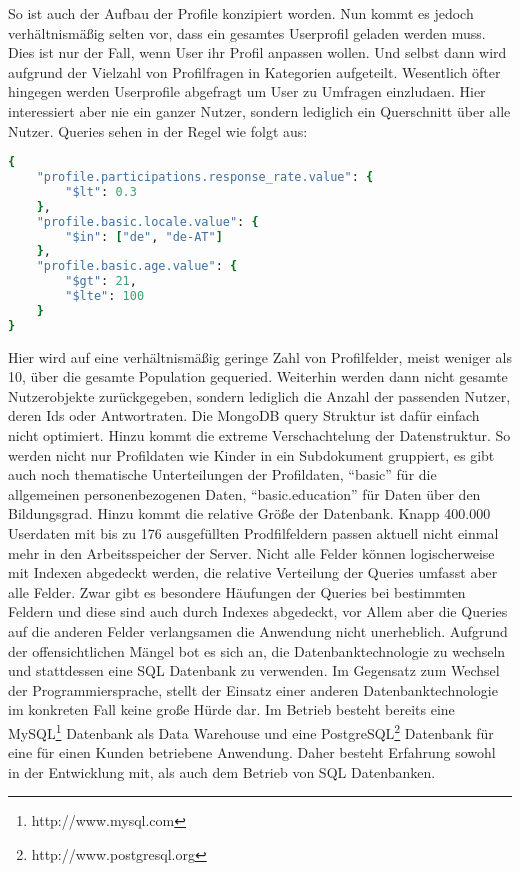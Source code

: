 So ist auch der Aufbau der Profile konzipiert worden. Nun kommt es jedoch verhältnismäßig selten vor, dass ein gesamtes Userprofil geladen werden muss. Dies ist nur der Fall, wenn User ihr Profil anpassen wollen. Und selbst dann wird aufgrund der Vielzahl von Profilfragen in Kategorien aufgeteilt.
Wesentlich öfter hingegen werden Userprofile abgefragt um User zu Umfragen einzludaen. Hier interessiert aber nie ein ganzer Nutzer, sondern lediglich ein Querschnitt über alle Nutzer. Queries sehen in der Regel wie folgt aus:
\begin{lstlisting}[language=Ruby]
{
    "profile.participations.response_rate.value": {
        "$lt": 0.3
    },
    "profile.basic.locale.value": {
        "$in": ["de", "de-AT"]
    },
    "profile.basic.age.value": {
        "$gt": 21,
        "$lte": 100
    }
}
\end{lstlisting}

Hier wird auf eine verhältnismäßig geringe Zahl von Profilfelder, meist weniger als 10, über die gesamte Population gequeried. Weiterhin werden dann nicht gesamte Nutzerobjekte zurückgegeben, sondern lediglich die Anzahl der passenden Nutzer, deren Ids oder Antwortraten. Die MongoDB query Struktur ist dafür einfach nicht optimiert. Hinzu kommt die extreme Verschachtelung der Datenstruktur. So werden nicht nur Profildaten wie Kinder in ein Subdokument gruppiert, es gibt auch noch thematische Unterteilungen der Profildaten, ``basic'' für die allgemeinen personenbezogenen Daten, ``basic.education'' für Daten über den Bildungsgrad.
Hinzu kommt die relative Größe der Datenbank. Knapp 400.000 Userdaten mit bis zu 176 ausgefüllten Prodfilfeldern passen aktuell nicht einmal mehr in den Arbeitsspeicher der Server. Nicht alle Felder können logischerweise mit Indexen abgedeckt werden, die relative Verteilung der Queries umfasst aber alle Felder. Zwar gibt es besondere Häufungen der Queries bei bestimmten Feldern und diese sind auch durch Indexes abgedeckt, vor Allem aber die Queries auf die anderen Felder verlangsamen die Anwendung nicht unerheblich.
Aufgrund der offensichtlichen Mängel bot es sich an, die Datenbanktechnologie zu wechseln und stattdessen eine SQL Datenbank zu verwenden. Im Gegensatz zum Wechsel der Programmiersprache, stellt der Einsatz einer anderen Datenbanktechnologie im konkreten Fall keine große Hürde dar. Im Betrieb besteht bereits eine MySQL\footnote{http://www.mysql.com} Datenbank als Data Warehouse und eine PostgreSQL\footnote{http://www.postgresql.org} Datenbank für eine für einen Kunden betriebene Anwendung. Daher besteht Erfahrung sowohl in der Entwicklung mit, als auch dem Betrieb von SQL Datenbanken.

